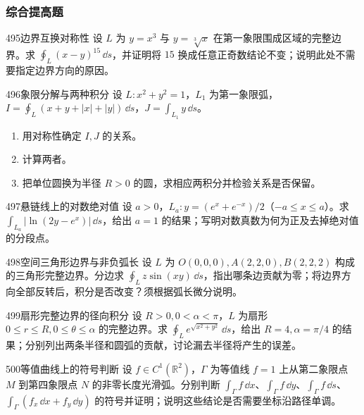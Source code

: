 \subsubsection{综合提高题}

\begin{exercise}{495}{边界互换对称性}
设 $L$ 为 $y=x^3$ 与 $y=\sqrt[3]x$ 在第一象限围成区域的完整边界。求 $\oint_L(x-y)^{15}\,\dd s$，并证明将 $15$ 换成任意正奇数结论不变；说明此处不需要指定边界方向的原因。
\end{exercise}

\begin{exercise}{496}{象限分解与两种积分}
设 $L:x^2+y^2=1$，$L_1$ 为第一象限弧，$I=\oint_L(x+y+|x|+|y|)\,\dd s$，$J=\int_{L_1}y\,\dd s$。
\begin{enumerate}[label=(\arabic*)]
\item 用对称性确定 $I,J$ 的关系。
\item 计算两者。
\item 把单位圆换为半径 $R>0$ 的圆，求相应两积分并检验关系是否保留。
\end{enumerate}
\end{exercise}

\begin{exercise}{497}{悬链线上的对数绝对值}
设 $a>0$，$L_a:y=(e^x+e^{-x})/2$（$-a\leq x\leq a$）。求 $\int_{L_a}|\ln(2y-e^x)|\,\dd s$，给出 $a=1$ 的结果；写明对数真数为何为正及去掉绝对值的分段点。
\end{exercise}

\begin{exercise}{498}{空间三角形边界与非负弧长}
设 $L$ 为 $O(0,0,0),A(2,2,0),B(2,2,2)$ 构成的三角形完整边界。分边求 $\oint_Lz\sin(xy)\,\dd s$，指出哪条边贡献为零；将边界方向全部反转后，积分是否改变？须根据弧长微分说明。
\end{exercise}

\begin{exercise}{499}{扇形完整边界的径向积分}
设 $R>0,0<\alpha<\pi$，$L$ 为扇形 $0\leq r\leq R,0\leq\theta\leq\alpha$ 的完整边界。求 $\oint_Le^{\sqrt{x^2+y^2}}\,\dd s$，给出 $R=4,\alpha=\pi/4$ 的结果；分别列出两条半径和圆弧的贡献，讨论漏去半径将产生的误差。
\end{exercise}

\begin{exercise}{500}{等值曲线上的符号判断}
设 $f\in C^1(\mathbb R^2)$，$\Gamma$ 为等值线 $f=1$ 上从第二象限点 $M$ 到第四象限点 $N$ 的非零长度光滑弧。分别判断 $\int_\Gamma f\,\dd x$、$\int_\Gamma f\,\dd y$、$\int_\Gamma f\,\dd s$、$\int_\Gamma(f_x\,\dd x+f_y\,\dd y)$ 的符号并证明；说明这些结论是否需要坐标沿路径单调。
\end{exercise}

